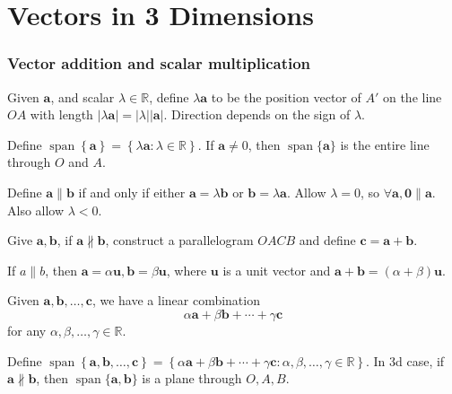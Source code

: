 \documentclass[10pt]{article}
\DeclareMathOperator{\spn}{span}
\begin{document}
    \part{Vectors in 3 Dimensions}
    \section{Vector addition and scalar multiplication}
    \begin{definition}
        Given $ \mathbf{a} $, and scalar $ \lambda\in \mathbb{R} $, define $ \lambda \mathbf{a} $ to be the position vector of $ A' $ on the line $OA$ with length $ |\lambda \mathbf{a}|=\left| \lambda \right| \left| \mathbf{a} \right|  $. Direction depends on the sign of $ \lambda $.
    \end{definition}
    Define $ \spn\left\{ \mathbf{a}\right\} = \left\{ \lambda \mathbf{a}: \lambda\in \mathbb{R} \right\} $. If $ \mathbf{a}\neq 0 $, then $ \spn \{\mathbf{a}\} $ is the entire line through $O$ and $A$.

    Define $ \mathbf{a} \parallel \mathbf{b} $ if and only if either $ \mathbf{a} = \lambda \mathbf{b} $ or $ \mathbf{b} = \lambda \mathbf{a} $. Allow $ \lambda=0 $, so $\forall \mathbf{a}, \mathbf{0} \parallel \mathbf{a} $. Also allow $\lambda<0$.
    \begin{definition}
        Give $ \mathbf{a}, \mathbf{b} $, if $ \mathbf{a} \nparallel \mathbf{b} $, construct a parallelogram $OACB$ and define $ \mathbf{c} = \mathbf{a} + \mathbf{b} $.
    \end{definition}
    If $ a \parallel b $, then $ \mathbf{a} = \alpha \mathbf{u}, \mathbf{b}=\beta \mathbf{u} $, where $\mathbf{u}$ is a unit vector and $ \mathbf{a}+\mathbf{b}=(\alpha+\beta)\mathbf{u} $.

    Given $ \mathbf{a},\mathbf{b},\dots,\mathbf{c} $, we have a linear combination
    \[
        \alpha \mathbf{a}+ \beta \mathbf{b}+\cdots+\gamma \mathbf{c}
    \]
    for any $ \alpha,\beta,\dots, \gamma\in \mathbb{R}  $.

    Define $ \spn \left\{ \mathbf{a},\mathbf{b},\dots,\mathbf{c}\right\} = \left\{ \alpha \mathbf{a}+ \beta \mathbf{b}+\cdots+\gamma \mathbf{c}:\alpha,\beta,\dots, \gamma\in \mathbb{R} \right\} $. In 3d case, if $ \mathbf{a} \nparallel \mathbf{b} $, then $ \spn \{ \mathbf{a}, \mathbf{b} \} $ is a plane through $O,A,B$.
    
\end{document}
